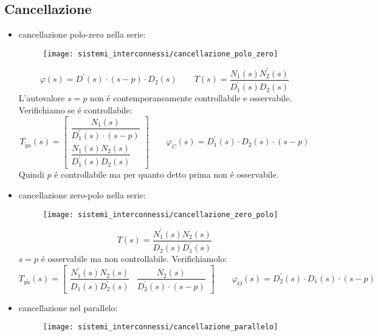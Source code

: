 \documentclass[../main.tex]{subfiles}
\begin{document}
	\subsection{Cancellazione}
		\begin{itemize}
			\item 
				cancellazione polo-zero nella serie:
				\begin{figure}[h!]
					\centering\texttt{[image: sistemi\_interconnessi/cancellazione\_polo\_zero]}
				\end{figure}
			
				\[
					\varphi(s) = D^{'}(s) \cdot (s-p) \cdot D_2(s) \qquad T(s) = \dfrac{N_1(s) N_2^{'}(s)}{D_1^{'}(s) D_2(s)}
				\]
				L'autovalore $ s=p $ non \'e contemporaneamente controllabile e osservabile. Verifichiamo se \'e controllabile:
				\[
					T_{\tilde y u}(s) =
					\begin{bmatrix}
						\dfrac{N_1(s)}{D_1^{'}(s) \cdot (s-p)}\\[.5cm]
						\dfrac{N_1(s)N_2(s)}{D_1^{'}(s) D_2(s)}
					\end{bmatrix}
					\qquad
					\varphi_C(s) = D_1^{'}(s) \cdot D_2(s) \cdot (s-p)
				\]
				Quindi $ p $ \'e controllabile ma per quanto detto prima non \'e osservabile.
			\item 
				cancellazione zero-polo nella serie:
				\begin{figure}[h!]
					\centering\texttt{[image: sistemi\_interconnessi/cancellazione\_zero\_polo]}
				\end{figure}
			
				\[
					T(s) =
					\dfrac{N_1^{'}(s) N_2(s)}{D_2(s) D_1^{'}(s)}
				\]
				$ s=p $ \'e osservabile ma non controllabile. Verifichiamolo:
				\[
					T_{y \tilde u}(s) =
					\begin{bmatrix}
						\dfrac{N_1^{'}(s) N_2(s)}{D_1(s) D_2^{'}(s)} & \dfrac{N_2(s)}{D_2^{'}(s) \cdot (s-p)}
					\end{bmatrix}
					\qquad
					\varphi_O(s) = D_2^{'}(s) \cdot D_1(s) \cdot (s-p)
				\]
			\item 
				cancellazione nel parallelo:
				\begin{figure}[h!]
					\centering\texttt{[image: sistemi\_interconnessi/cancellazione\_parallelo]}
				\end{figure}
			

\end{itemize}
\end{document}

